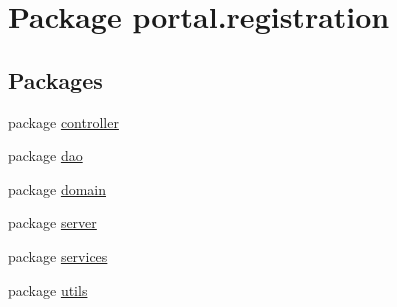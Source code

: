 \hypertarget{namespaceportal_1_1registration}{
\section{Package portal.registration}
\label{namespaceportal_1_1registration}
}
\subsection*{Packages}
\begin{DoxyCompactItemize}
\item 
package \hyperlink{namespaceportal_1_1registration_1_1controller}{controller}
\item 
package \hyperlink{namespaceportal_1_1registration_1_1dao}{dao}
\item 
package \hyperlink{namespaceportal_1_1registration_1_1domain}{domain}
\item 
package \hyperlink{namespaceportal_1_1registration_1_1server}{server}
\item 
package \hyperlink{namespaceportal_1_1registration_1_1services}{services}
\item 
package \hyperlink{namespaceportal_1_1registration_1_1utils}{utils}
\end{DoxyCompactItemize}
